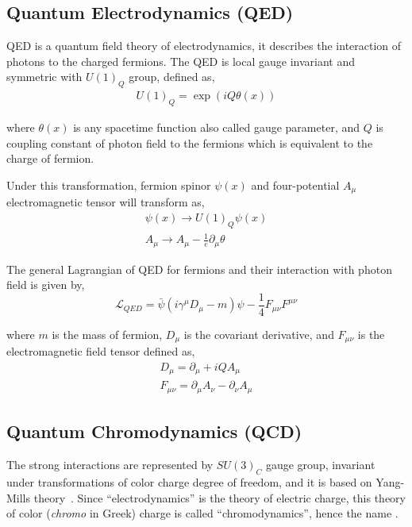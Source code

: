 \subsection{
  Quantum Electrodynamics (QED)
}\label{ch_intro:qed}

\gls{QED} is a quantum field theory of electrodynamics, it describes
the interaction of photons to the charged fermions.
The \gls{QED} is local gauge invariant and symmetric with \( {U(1)}_{Q} \) group,
defined as,
%
\begin{align}
  {U(1)}_{Q} = \exp\left( { i Q \theta (x) } \right)
\end{align}

where \( \theta (x) \) is any spacetime function also called gauge parameter,
and \( Q \) is coupling constant of photon field to the fermions
which is equivalent to the charge of fermion.

Under this transformation, fermion spinor \( \psi (x) \) and
four-potential \( A_{\mu} \) electromagnetic tensor will transform
as,
%
\begin{align}
  \psi (x) \rightarrow {U(1)}_{Q} \psi (x) \\
  A_{\mu} \rightarrow A_{\mu} - \frac{1}{e} \partial_{\mu} \theta
\end{align}

The general Lagrangian of \gls{QED} for fermions and their interaction
with photon field is given by,
%
\begin{equation}\label{eq:lag-qed}
  {\mathcal{L}}_{QED} = \bar{\psi} ( i {\gamma}^{\mu} {D}_{\mu} - m ) \psi
  - \frac{1}{4} {F}_{\mu \nu} {F}^{\mu \nu}
\end{equation}

where \( m \) is the mass of fermion,
\( {D}_{\mu} \) is the covariant derivative,
and \( {F}_{\mu \nu} \) is the electromagnetic field tensor defined as,
%
\begin{align}
  {D}_{\mu} = \partial_{\mu} + i Q A_{\mu} \\
  {F}_{\mu \nu} = \partial_{\mu} A_{\nu} - \partial_{\nu} A_{\mu}
\end{align}

\subsection{
  Quantum Chromodynamics (QCD)
}\label{ch_intro:qcd}

The strong interactions are represented by \( {SU(3)}_{C} \) gauge group, invariant
under transformations of color charge degree of freedom, and it is based
on Yang-Mills theory~\cite{Yang-Mill:1954}. Since ``electrodynamics''
is the theory of electric charge, this theory of color (\textit{chromo} in Greek)
charge is called ``chromodynamics'', hence the name .

